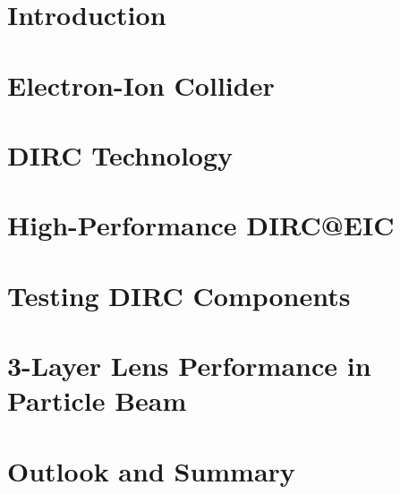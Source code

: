 \documentclass[12pt]{report}
\numberwithin{equation}{chapter}
\begin{document}
\listofcomments


\chapter{Introduction}
%
\chapter{Electron-Ion Collider}
%
\chapter{DIRC Technology}
%
\chapter{High-Performance DIRC@EIC}
%
\chapter{Testing DIRC Components}
%
\chapter{3-Layer Lens Performance in Particle Beam}
%
\chapter{Outlook and Summary}

\end{document}
